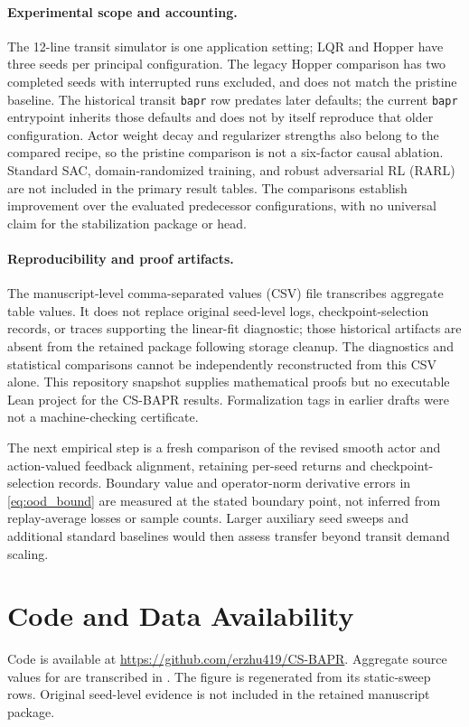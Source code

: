 \documentclass[10pt]{article}
\begin{document}
\paragraph{Experimental scope and accounting.}
The 12-line transit simulator is one application setting; LQR and Hopper have three seeds per principal configuration. The legacy Hopper comparison has two completed seeds with interrupted runs excluded, and does not match the pristine baseline. The historical transit \texttt{bapr} row predates later defaults; the current \texttt{bapr} entrypoint inherits those defaults and does not by itself reproduce that older configuration. Actor weight decay and regularizer strengths also belong to the compared recipe, so the pristine comparison is not a six-factor causal ablation. Standard SAC, domain-randomized training, and robust adversarial RL (RARL) are not included in the primary result tables. The comparisons establish improvement over the evaluated predecessor configurations, with no universal claim for the stabilization package or head.

\paragraph{Reproducibility and proof artifacts.}
The manuscript-level comma-separated values (CSV) file transcribes aggregate table values. It does not replace original seed-level logs, checkpoint-selection records, or traces supporting the linear-fit diagnostic; those historical artifacts are absent from the retained package following storage cleanup. The diagnostics and statistical comparisons cannot be independently reconstructed from this CSV alone. This repository snapshot supplies mathematical proofs but no executable Lean project for the CS-BAPR results. Formalization tags in earlier drafts were not a machine-checking certificate.

The next empirical step is a fresh comparison of the revised smooth actor and action-valued feedback alignment, retaining per-seed returns and checkpoint-selection records. Boundary value and operator-norm derivative errors in \eqref{eq:ood_bound} are measured at the stated boundary point, not inferred from replay-average losses or sample counts. Larger auxiliary seed sweeps and additional standard baselines would then assess transfer beyond transit demand scaling.

\section*{Code and Data Availability}
Code is available at \url{https://github.com/erzhu419/CS-BAPR}. Aggregate source values for  are transcribed in . The figure is regenerated from its static-sweep rows. Original seed-level evidence is not included in the retained manuscript package.
\end{document}
